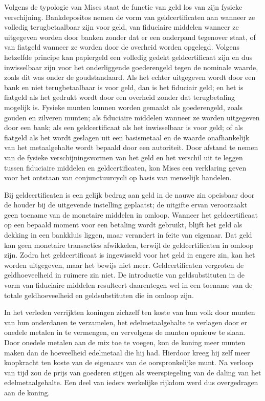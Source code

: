 Volgens de typologie van Mises staat de functie van geld los van zijn fysieke verschijning. Bankdeposito\textquotesingle s nemen de vorm van geldcertificaten aan wanneer ze volledig terugbetaalbaar zijn voor geld, van fiduciaire middelen wanneer ze uitgegeven worden door banken zonder dat er een onderpand tegenover staat, of van fiatgeld wanneer ze worden door de overheid worden opgelegd. Volgens hetzelfde principe kan papiergeld een volledig gedekt geldcertificaat zijn en dus inwisselbaar zijn voor het onderliggende goederengeld tegen de nominale waarde, zoals dit was onder de goudstandaard. Als het echter uitgegeven wordt door een bank en niet terugbetaalbaar is voor geld, dan is het fiduciair geld; en het is fiatgeld als het gedrukt wordt door een overheid zonder dat terugbetaling mogelijk is. Fysieke munten kunnen worden gemaakt als goederengeld, zoals gouden en zilveren munten; als fiduciaire middelen wanneer ze worden uitgegeven door een bank; als een geldcertificaat als het inwisselbaar is voor geld; of als fiatgeld als het wordt geslagen uit een basismetaal en de waarde onafhankelijk van het metaalgehalte wordt bepaald door een autoriteit. Door afstand te nemen van de fysieke verschijningsvormen van het geld en het verschil uit te leggen tussen fiduciaire middelen en geldcertificaten, kon Mises een verklaring geven voor het ontstaan van conjunctuurcycli op basis van menselijk handelen.

Bij geldcertificaten is een gelijk bedrag aan geld in de nauwe zin opeisbaar door de houder bij de uitgevende instelling geplaatst; de uitgifte ervan veroorzaakt geen toename van de monetaire middelen in omloop. Wanneer het geldcertificaat op een bepaald moment voor een betaling wordt gebruikt, blijft het geld als dekking in een bankkluis liggen, maar verandert in feite van eigenaar. Dat geld kan geen monetaire transacties afwikkelen, terwijl de geldcertificaten in omloop zijn. Zodra het geldcertificaat is ingewisseld voor het geld in engere zin, kan het worden uitgegeven, maar het bewijs niet meer. Geldcertificaten vergroten de geldhoeveelheid in ruimere zin niet. De introductie van geldsubstituten in de vorm van fiduciaire middelen resulteert daarentegen wel in een toename van de totale geldhoeveelheid en geldsubstituten die in omloop zijn.

In het verleden verrijkten koningen zichzelf ten koste van hun volk door munten van hun onderdanen te verzamelen, het edelmetaalgehalte te verlagen door er onedele metalen in te vermengen, en vervolgens de munten opnieuw te slaan. Door onedele metalen aan de mix toe te voegen, kon de koning meer munten maken dan de hoeveelheid edelmetaal die hij had. Hierdoor kreeg hij zelf meer koopkracht ten koste van de eigenaars van de oorspronkelijke munt. Na verloop van tijd zou de prijs van goederen stijgen als weerspiegeling van de daling van het edelmetaalgehalte. Een deel van ieders werkelijke rijkdom werd dus overgedragen aan de koning.

